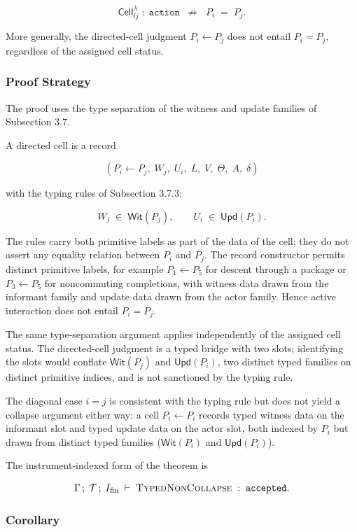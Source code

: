 \documentclass[11pt]{article}
\theoremstyle{definition}
\begin{document}
\[
\mathsf{Cell}_{ij}^{\lambda}\;:\;\texttt{action}\;\;\not\Rightarrow\;\;P_i\;=\;P_j.
\]

More generally, the directed-cell judgment \(P_i\leftarrow P_j\) does not entail \(P_i=P_j\), regardless of the assigned cell status.

\subsubsection{Proof Strategy}

The proof uses the type separation of the witness and update families of Subsection 3.7.

A directed cell is a record

\[
(P_i\leftarrow P_j,\;W_j,\;U_i,\;L,\;V,\;\Theta,\;A,\;\delta)
\]

with the typing rules of Subsection 3.7.3:

\[
W_j\;\in\;\mathsf{Wit}(P_j),\qquad U_i\;\in\;\mathsf{Upd}(P_i).
\]

The rules carry both primitive labels as part of the data of the cell; they do not assert any equality relation between \(P_i\) and \(P_j\). The record constructor permits distinct primitive labels, for example \(P_1\leftarrow P_5\) for descent through a package or \(P_3\leftarrow P_5\) for noncommuting completions, with witness data drawn from the informant family and update data drawn from the actor family. Hence active interaction does not entail \(P_i=P_j\).

The same type-separation argument applies independently of the assigned cell status. The directed-cell judgment is a typed bridge with two slots; identifying the slots would conflate \(\mathsf{Wit}(P_j)\) and \(\mathsf{Upd}(P_i)\), two distinct typed families on distinct primitive indices, and is not sanctioned by the typing rule.

The diagonal case \(i=j\) is consistent with the typing rule but does not yield a collapse argument either way: a cell \(P_i\leftarrow P_i\) records typed witness data on the informant slot and typed update data on the actor slot, both indexed by \(P_i\) but drawn from distinct typed families (\(\mathsf{Wit}(P_i)\) and \(\mathsf{Upd}(P_i)\)).

The instrument-indexed form of the theorem is

\[
\Gamma\,;\;\mathcal T\,;\;I_{\mathrm{fin}}\;\vdash\;\textsc{TypedNonCollapse}\;:\;\texttt{accepted}.
\]

\subsubsection{Corollary}
\end{document}
